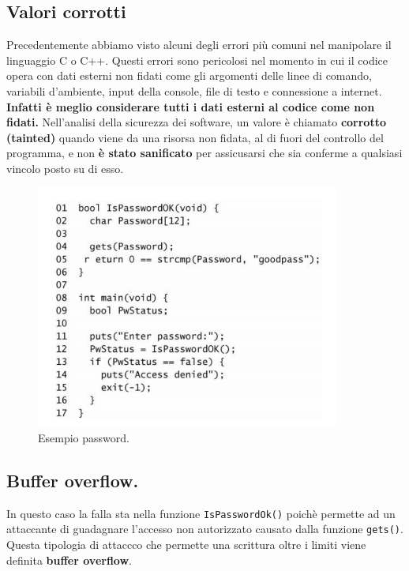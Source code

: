 \subsection{Valori corrotti}
Precedentemente abbiamo visto alcuni degli errori più comuni nel manipolare il linguaggio C o C++. Questi errori sono pericolosi nel momento in cui il codice opera con dati esterni non fidati come gli argomenti delle linee di comando, variabili d'ambiente, input della console, file di testo e connessione a internet. \textbf{Infatti è meglio considerare tutti i dati esterni al codice come non fidati. } Nell'analisi della sicurezza dei software, un valore è chiamato \textbf{corrotto (tainted)} quando viene da una risorsa non fidata, al di fuori del controllo del programma, e non \textbf{è stato sanificato} per assicusarsi che sia conferme a qualsiasi vincolo posto su di esso.
\begin{figure}[H]
    \centering
    \includegraphics[width=10cm, keepaspectratio]{capitoli/secure_coding/img/cap_2/password_example.png}
    \caption{Esempio password.}\label{fig:password}
\end{figure}

\subsection{Buffer overflow.}
In questo caso la falla sta nella funzione \verb|IsPasswordOk()| poichè permette ad un attaccante di guadagnare l'accesso non autorizzato causato dalla funzione \verb|gets()|. Questa tipologia di attaccco che permette una scrittura oltre i limiti viene definita \textbf{buffer overflow}.

